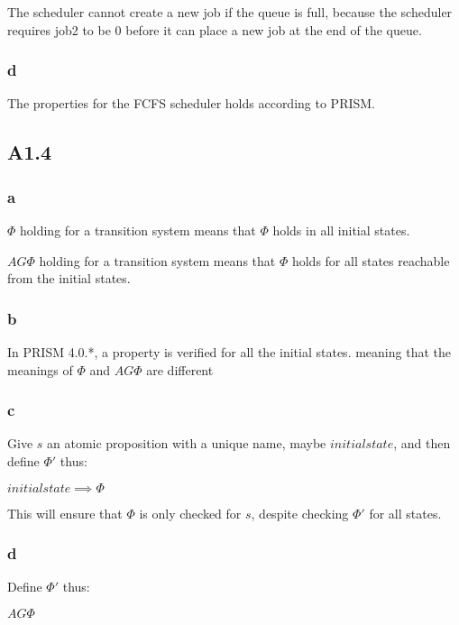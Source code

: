 The scheduler cannot create a new job if the queue is full, because the scheduler
requires job2 to be 0 before it can place a new job at the end of the queue.

\subsubsection{d}

The properties for the FCFS scheduler holds according to PRISM.

\subsection{A1.4}

\subsubsection{a}

$\Phi$ holding for a transition system means that $\Phi$ holds
in all initial states.

$AG \Phi$ holding for a transition system means that $\Phi$ holds
for all states reachable from the initial states.

\subsubsection{b}

In PRISM 4.0.*, a property is verified for all the initial states.
meaning that the meanings of $\Phi$ and $AG \Phi$ are different

\subsubsection{c}

Give $s$ an atomic proposition with a unique name,
maybe $initialstate$, and then define $\Phi '$ thus:

$initialstate \implies \Phi$

This will ensure that $\Phi$ is only checked for $s$,
despite checking $\Phi '$ for all states.

\subsubsection{d}

Define $\Phi '$ thus:

$AG \Phi$

